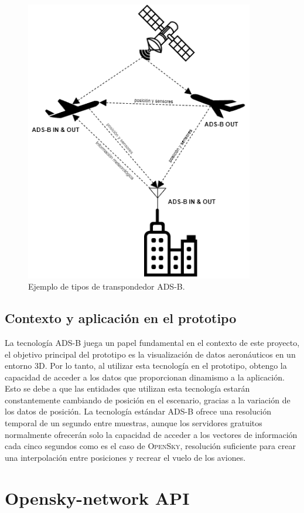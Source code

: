 \documentclass[a4paper, 11pt]{book}
\begin{document}
\begin{figure}[h]
	\centering
	\includegraphics[width=10cm, keepaspectratio]{img/adsbtypes.drawio.png}
	\caption{Ejemplo de tipos de transpondedor ADS-B.}
	\label{fig:adsbtypes}
\end{figure}
\subsection{Contexto y aplicación en el prototipo}
La tecnología \textsc{ADS-B} juega un papel fundamental en el contexto de este proyecto, el objetivo principal del prototipo es la visualización de datos aeronáuticos en un entorno \textsc{\gls{3D}}. Por lo tanto, al utilizar esta tecnología en el prototipo, obtengo la capacidad de acceder a los datos que proporcionan dinamismo a la aplicación. Esto se debe a que las entidades que utilizan esta tecnología estarán constantemente cambiando de posición en el escenario, gracias a la variación de los datos de posición.
La tecnología estándar \textsc{ADS-B} ofrece una resolución temporal de un segundo entre muestras, aunque los servidores gratuitos normalmente ofrecerán solo la capacidad de acceder a los vectores de información cada cinco segundos como es el caso de \textsc{OpenSky}, resolución suficiente para crear una interpolación entre posiciones y recrear el vuelo de los aviones.
\section{Opensky-network API}
\label{sec:opensky}
\end{document}
